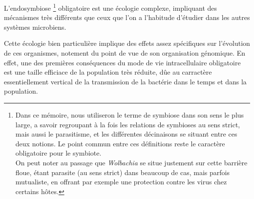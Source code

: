 


L’endosymbiose%
\footnote{Dans ce mémoire, nous utiliseron le terme de symbiose dans son sens le plus large, a savoir regroupant à la fois les relations de symbioses au sens strict, mais aussi le parasitisme, et les différentes décinaisons se situant entre ces deux notions. Le point commun entre ces définitions reste le caractère obligatoire pour le symbiote.\\
On peut noter au passage que \textit{Wolbachia} se situe justement sur cette barrière floue, étant parasite (au sens strict) dans beaucoup de cas, mais parfois mutualiste, en offrant par exemple une protection contre les virus chez certains hôtes.}
obligatoire est une écologie complexe, impliquant des mécanismes très différents que ceux que l’on a l’habitude d’étudier dans les autres systèmes microbiens.

Cette écologie bien particulière implique des effets assez spécifiques sur l'évolution de ces organismes, notement du point de vue de son organisation génomique.
En effet, une des premières conséquences du mode de vie intracellulaire obligatoire est une taille efficiace de la population très réduite, dûe au carractère essentiellement vertical de la transmission de la bactérie dans le temps et dans la population.

